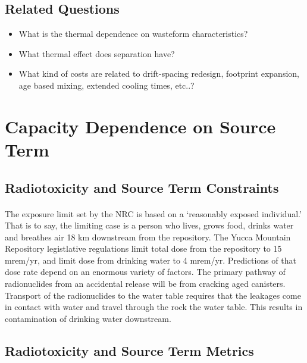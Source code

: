 \subsection{Related Questions}
\begin{itemize}
\item{} What is the thermal dependence on wasteform characteristics?
\item{} What thermal effect does separation have?
\item{} What kind of costs are related to drift-spacing redesign, footprint expansion, age based 
  mixing, extended cooling times, etc..?  \end{itemize}
\section{Capacity Dependence on Source Term}
\subsection{Radiotoxicity and Source Term Constraints}
\paragraph{}
The exposure limit set by the NRC is based on a `reasonably exposed individual.' That is to say, the 
limiting case is a person who lives, grows food, drinks water and breathes air 18 km downstream from 
the repository. The Yucca Mountain Repository legistlative regulations limit total dose from the 
repository to 15 mrem/yr, and limit dose from drinking water to 4 mrem/yr. Predictions of that dose 
rate depend on an enormous variety of factors. The primary pathway of radionuclides from an 
accidental release will be from cracking aged canisters. Transport of the radionuclides to the water 
table requires that the leakages come in contact with water and travel through the rock the water 
table. This results in contamination of drinking water downstream.  \subsection{Radiotoxicity and 
Source Term Metrics}

